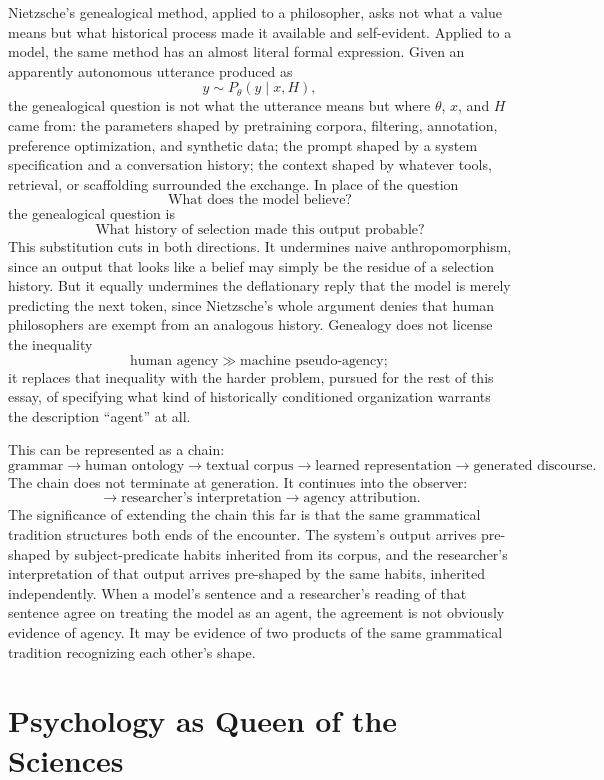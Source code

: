 \documentclass[11pt]{article}
\begin{document}
Nietzsche's genealogical method, applied to a philosopher, asks not what a value means but what historical process made it available and self-evident. Applied to a model, the same method has an almost literal formal expression. Given an apparently autonomous utterance produced as
\[
y \sim P_\theta(y \mid x, H),
\]
the genealogical question is not what the utterance means but where \(\theta\), \(x\), and \(H\) came from: the parameters shaped by pretraining corpora, filtering, annotation, preference optimization, and synthetic data; the prompt shaped by a system specification and a conversation history; the context shaped by whatever tools, retrieval, or scaffolding surrounded the exchange. In place of the question
\[
\text{What does the model believe?}
\]
the genealogical question is
\[
\text{What history of selection made this output probable?}
\]
This substitution cuts in both directions. It undermines naive anthropomorphism, since an output that looks like a belief may simply be the residue of a selection history. But it equally undermines the deflationary reply that the model is merely predicting the next token, since Nietzsche's whole argument denies that human philosophers are exempt from an analogous history. Genealogy does not license the inequality
\[
\text{human agency} \gg \text{machine pseudo-agency};
\]
it replaces that inequality with the harder problem, pursued for the rest of this essay, of specifying what kind of historically conditioned organization warrants the description ``agent'' at all.

This can be represented as a chain:
\[
\text{grammar} \rightarrow \text{human ontology} \rightarrow \text{textual corpus} \rightarrow \text{learned representation} \rightarrow \text{generated discourse}.
\]
The chain does not terminate at generation. It continues into the observer:
\[
\rightarrow \text{researcher's interpretation} \rightarrow \text{agency attribution}.
\]
The significance of extending the chain this far is that the same grammatical tradition structures both ends of the encounter. The system's output arrives pre-shaped by subject-predicate habits inherited from its corpus, and the researcher's interpretation of that output arrives pre-shaped by the same habits, inherited independently. When a model's sentence and a researcher's reading of that sentence agree on treating the model as an agent, the agreement is not obviously evidence of agency. It may be evidence of two products of the same grammatical tradition recognizing each other's shape.

\section{Psychology as Queen of the Sciences}
\end{document}
